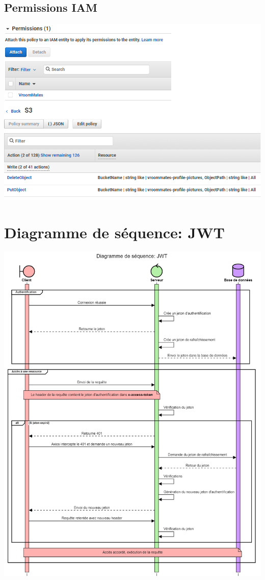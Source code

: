 \begin{landscape}
\section{Permissions IAM}
\label{Permissions IAM}
\begin{center}
\includegraphics[scale=0.5]{medias/permissionsIAM.png}
\end{center}
\end{landscape}

\section{Diagramme de séquence: JWT}
\label{Diagramme de séquence: JWT}
\begin{center}
\includegraphics[width=\linewidth]{medias/diagrammeJWT.png}
\end{center}

